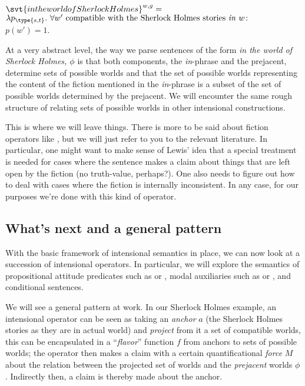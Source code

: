 \ex $\svt{in the world of Sherlock Holmes}^{w,g} =$\\
$\lambda p_{\type{s,t}}.\ \forall w' \mbox{ compatible with the Sherlock Holmes
  stories \emph{in} } w\!:$\\
$p(w') = 1$. \xe

At a very abstract level, the way we parse sentences of the form \emph{in the
  world of Sherlock Holmes, $\phi$} is that both components, the
\emph{in}-phrase and the prejacent, determine sets of possible worlds and that
the set of possible worlds representing the content of the fiction mentioned in
the \emph{in}-phrase is a subset of the set of possible worlds determined by the
prejacent. We will encounter the same rough structure of relating sets of
possible worlds in other intensional constructions.

This is where we will leave things. There is more to be said about fiction
operators like , but we will just
refer to you to the relevant literature. In particular, one might want to make
sense of Lewis' idea that a special treatment is needed for cases where the
sentence makes a claim about things that are left open by the fiction (no
truth-value, perhaps?). One also needs to figure out how to deal with cases
where the fiction is internally inconsistent. In any case, for our purposes
we're done with this kind of operator.

\subsection{What's next and a general pattern}
\label{sec:next}

With the basic framework of intensional semantics in place, we can now look at a
succession of intensional operators. In particular, we will explore the
semantics of propositional attitude predicates such as  or
, modal auxiliaries such as  or
, and conditional sentences.

We will see a general pattern at work. In our Sherlock Holmes example, an
intensional operator can be seen as taking an \emph{anchor} \(a\) (the Sherlock
Holmes stories as they are in actual world) and \emph{project} from it a set of
compatible worlds, this can be encapsulated in a ``\emph{flavor}'' function
\(f\) from anchors to sets of possible worlds; the operator then makes a claim
with a certain quantificational \emph{force} \(M\) about the relation between
the projected set of worlds and the \emph{prejacent} worlds \(\phi\). Indirectly
then, a claim is thereby made about the anchor.

